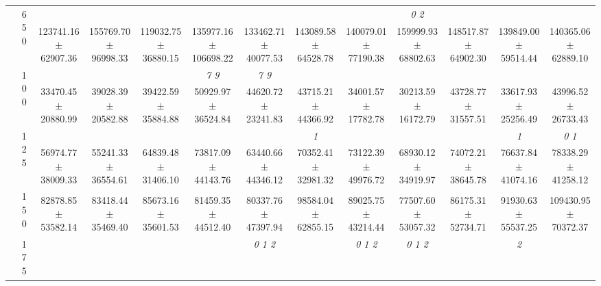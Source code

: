 \begin{table}[h]
{\begin{tabular}{
        ccccccccccccc}
 & \multirow{2}{*}{650}& & & & & & & & \textit{ 0 2 }& & &  \\ 
 & & 123741.16 $\pm$ 62907.36& 155769.70 $\pm$ 96998.33& 119032.75 $\pm$ 36880.15& 135977.16 $\pm$ 106698.22& 133462.71 $\pm$ 40077.53& 143089.58 $\pm$ 64528.78& 140079.01 $\pm$ 77190.38& 159999.93 $\pm$ 68802.63& 148517.87 $\pm$ 64902.30& 139849.00 $\pm$ 59514.44& 140365.06 $\pm$ 62889.10 \\ \midrule 
 & \multirow{2}{*}{100}& & & & \textit{ 7 9 }& \textit{ 7 9 }& & & & & &  \\ 
 & & 33470.45 $\pm$ 20880.99& 39028.39 $\pm$ 20582.88& 39422.59 $\pm$ 35884.88& 50929.97 $\pm$ 36524.84& 44620.72 $\pm$ 23241.83& 43715.21 $\pm$ 44366.92& 34001.57 $\pm$ 17782.78& 30213.59 $\pm$ 16172.79& 43728.77 $\pm$ 31557.51& 33617.93 $\pm$ 25256.49& 43996.52 $\pm$ 26733.43 \\ 
 & \multirow{2}{*}{125}& \cellcolor[HTML]{EFEFEF} & \cellcolor[HTML]{EFEFEF} & \cellcolor[HTML]{EFEFEF} & \cellcolor[HTML]{EFEFEF} & \cellcolor[HTML]{EFEFEF} & \cellcolor[HTML]{EFEFEF} \textit{ 1 }& \cellcolor[HTML]{EFEFEF} & \cellcolor[HTML]{EFEFEF} & \cellcolor[HTML]{EFEFEF} & \cellcolor[HTML]{EFEFEF} \textit{ 1 }& \cellcolor[HTML]{EFEFEF} \textit{ 0 1 } \\ 
 & & \cellcolor[HTML]{EFEFEF} 56974.77 $\pm$ 38009.33& \cellcolor[HTML]{EFEFEF} 55241.33 $\pm$ 36554.61& \cellcolor[HTML]{EFEFEF} 64839.48 $\pm$ 31406.10& \cellcolor[HTML]{EFEFEF} 73817.09 $\pm$ 44143.76& \cellcolor[HTML]{EFEFEF} 63440.66 $\pm$ 44346.12& \cellcolor[HTML]{EFEFEF} 70352.41 $\pm$ 32981.32& \cellcolor[HTML]{EFEFEF} 73122.39 $\pm$ 49976.72& \cellcolor[HTML]{EFEFEF} 68930.12 $\pm$ 34919.97& \cellcolor[HTML]{EFEFEF} 74072.21 $\pm$ 38645.78& \cellcolor[HTML]{EFEFEF} 76637.84 $\pm$ 41074.16& \cellcolor[HTML]{EFEFEF} 78338.29 $\pm$ 41258.12 \\ 
 & \multirow{2}{*}{150}& & & & & & & & & & &  \\ 
 & & 82878.85 $\pm$ 53582.14& 83418.44 $\pm$ 35469.40& 85673.16 $\pm$ 35601.53& 81459.35 $\pm$ 44512.40& 80337.76 $\pm$ 47397.94& 98584.04 $\pm$ 62855.15& 89025.75 $\pm$ 43214.44& 77507.60 $\pm$ 53057.32& 86175.31 $\pm$ 52734.71& 91930.63 $\pm$ 55537.25& 109430.95 $\pm$ 70372.37 \\ 
 & \multirow{2}{*}{175}& \cellcolor[HTML]{EFEFEF} & \cellcolor[HTML]{EFEFEF} & \cellcolor[HTML]{EFEFEF} & \cellcolor[HTML]{EFEFEF} & \cellcolor[HTML]{EFEFEF} \textit{ 0 1 2 }& \cellcolor[HTML]{EFEFEF} & \cellcolor[HTML]{EFEFEF} \textit{ 0 1 2 }& \cellcolor[HTML]{EFEFEF} \textit{ 0 1 2 }& \cellcolor[HTML]{EFEFEF} & \cellcolor[HTML]{EFEFEF} \textit{ 2 }& \cellcolor[HTML]{EFEFEF}  \\ 

\end{tabular}}
\end{table}

